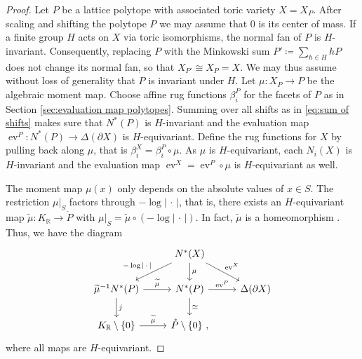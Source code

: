 \documentclass[11pt, a4paper]{amsart}
\theoremstyle{definition}
\theoremstyle{myitemstyle}
\newcommand{\R}{\mathbb{R}}
\DeclareMathOperator{\ev}{ev}
\begin{document}
\begin{proof}
Let $P$ be a lattice polytope with associated toric variety $X=X_P$. After scaling and shifting the polytope $P$ we may assume that $0$ is its center of mass.
If a finite group $H$ acts on $X$ via toric isomorphisms, the normal fan of $P$ is $H$-invariant. Consequently, replacing $P$ with the Minkowski sum $P' \coloneqq \sum_{h\in H} hP$ does not change its normal fan, so that $X_{P'} \cong X_P = X$. We may thus assume without loss of generality that $P$ is invariant under $H$.   Let $\mu\colon X_P\to P$ be the algebraic moment map. Choose affine rug functions $\beta_i^P$ for the facets of $P$ as in Section \ref{sec:evaluation map polytopes}. Summing over all shifts as in \eqref{eq:sum of shifts} makes sure that $N^*(P)$ is $H$-invariant and the evaluation map $\ev^P\colon N^*(P)\to \Delta(\partial X)$ is $H$-equivariant. Define the rug functions for $X$ by pulling back along $\mu$, that is $\beta^X_i=\beta^P_i\circ \mu$. As $\mu$ is $H$-equivariant, each $N_i(X)$ is $H$-invariant and the evaluation map $\ev^X=\ev^P\circ \mu$ is $H$-equivariant as well. 

The moment map $\mu(x)$ only depends on the absolute values of $x\in S$. The restriction $\mu|_S$  factors through $-\log|\, \cdot\, |$, that is, there exists an $H$-equivariant map $\widetilde \mu\colon K_\R\to \mathring P$ with $\mu|_S=\widetilde \mu\circ (-\log|\, \cdot \, |)$. In fact, $\widetilde \mu$ is a homeomorphism \cite[Theorem 12.2.5]{CLS11}. Thus, we  have the  diagram
\[
\begin{tikzcd}
    &
        N^*(X)
        \arrow[dl,swap,"-\log|\, \cdot\, |"]
        \arrow[d,"\mu"]
        \arrow[dr,"\ev^X"]&
            \\
    \widetilde\mu^{-1}N^*(P)
    \arrow[d,"j"]
    \arrow[r,"\widetilde \mu"]&
        N^*(P)
        \arrow[d,"\simeq"]
        \arrow[r,"\ev^P"]&
            \Delta(\partial X)\\
    K_\R\setminus \{0\}
    \arrow[r,"\widetilde\mu"]&
        \mathring P\setminus \{0\} \ ,
\end{tikzcd}
\]
where all maps  are $H$-equivariant. 


\end{proof}
\end{document}
